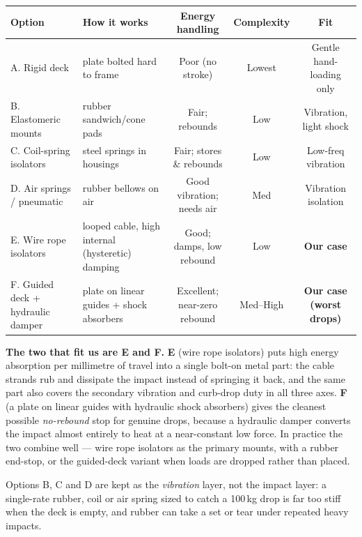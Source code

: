 \documentclass[11pt,a4paper]{article}
\begin{document}
\begin{center}\small
\renewcommand{\arraystretch}{1.25}
\begin{tabularx}{\linewidth}{@{}p{3.5cm}Y c c c@{}}
\toprule
\textbf{Option} & \textbf{How it works} & \textbf{Energy handling} & \textbf{Complexity} & \textbf{Fit} \\
\midrule
A. Rigid deck & plate bolted hard to frame & Poor (no stroke) & Lowest & Gentle hand-loading only \\
B. Elastomeric mounts & rubber sandwich/cone pads & Fair; rebounds & Low & Vibration, light shock \\
C. Coil-spring isolators & steel springs in housings & Fair; stores \& rebounds & Low & Low-freq vibration \\
D. Air springs / pneumatic & rubber bellows on air & Good vibration; needs air & Med & Vibration isolation \\
 E. Wire rope isolators & looped cable, high internal (hysteretic) damping & Good; damps, low rebound & Low & \textbf{Our case} \\
 F. Guided deck + hydraulic damper & plate on linear guides + shock absorbers & Excellent; near-zero rebound & Med--High & \textbf{Our case (worst drops)} \\
\bottomrule
\end{tabularx}
\end{center}

\noindent\textbf{The two that fit us are E and F.}
\textbf{E} (wire rope isolators) puts high energy absorption per millimetre of travel into a single
bolt-on metal part: the cable strands rub and dissipate the impact instead of springing it back, and the
same part also covers the secondary vibration and curb-drop duty in all three axes. \textbf{F} (a plate
on linear guides with hydraulic shock absorbers) gives the cleanest possible \emph{no-rebound} stop for
genuine drops, because a hydraulic damper converts the impact almost entirely to heat at a near-constant
low force. In practice the two combine well --- wire rope isolators as the primary mounts, with a rubber
end-stop, or the guided-deck variant when loads are dropped rather than placed.

Options B, C and D are kept as the \emph{vibration} layer, not the impact layer: a single-rate rubber,
coil or air spring sized to catch a 100\,kg drop is far too stiff when the deck is empty, and rubber can
take a set or tear under repeated heavy impacts.
\end{document}

